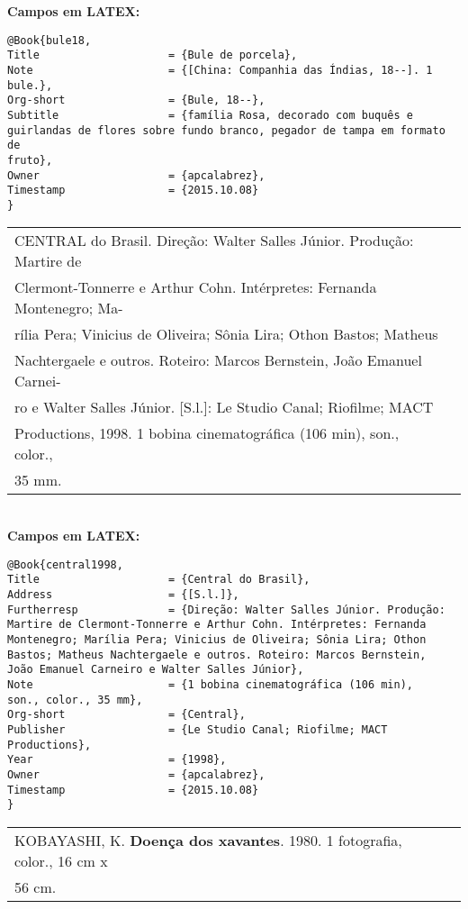 \textbf{Campos em LATEX:} 

\begin{verbatim}
@Book{bule18,
Title                    = {Bule de porcela},
Note                     = {[China: Companhia das Índias, 18--]. 1 
bule.}, 
Org-short                = {Bule, 18--},
Subtitle                 = {família Rosa, decorado com buquês e 
guirlandas de flores sobre fundo branco, pegador de tampa em formato de 
fruto},
Owner                    = {apcalabrez},
Timestamp                = {2015.10.08}
}
\end{verbatim}

\begin{tabular}{|l|c|} \hline
CENTRAL do Brasil. Direção: Walter Salles Júnior. Produção: Martire de\\
Clermont-Tonnerre e Arthur Cohn. Intérpretes: Fernanda Montenegro; Ma-\\
rília Pera; Vinicius de Oliveira; Sônia Lira; Othon Bastos; Matheus\\ 
Nachtergaele e outros. Roteiro: Marcos Bernstein, João Emanuel Carnei-\\
ro e Walter Salles Júnior. [S.l.]: Le Studio Canal; Riofilme; MACT \\
Productions, 1998. 1 bobina cinematográfica (106 min), son., color., 
\\35 mm. 
	\\\hline
\end{tabular} \\

\textbf{Campos em LATEX:} 

\begin{verbatim}
@Book{central1998,
Title                    = {Central do Brasil},
Address                  = {[S.l.]},
Furtherresp              = {Direção: Walter Salles Júnior. Produção: 
Martire de Clermont-Tonnerre e Arthur Cohn. Intérpretes: Fernanda 
Montenegro; Marília Pera; Vinicius de Oliveira; Sônia Lira; Othon 
Bastos; Matheus Nachtergaele e outros. Roteiro: Marcos Bernstein, 
João Emanuel Carneiro e Walter Salles Júnior},
Note                     = {1 bobina cinematográfica (106 min), 
son., color., 35 mm},
Org-short                = {Central},
Publisher                = {Le Studio Canal; Riofilme; MACT 
Productions},
Year                     = {1998},
Owner                    = {apcalabrez},
Timestamp                = {2015.10.08}
}
\end{verbatim}


\begin{tabular}{|l|c|} \hline
KOBAYASHI, K. \textbf{Doença dos xavantes}. 1980. 1 fotografia, color., 16 cm x \\
56 cm. 
	\\\hline
\end{tabular} \\

